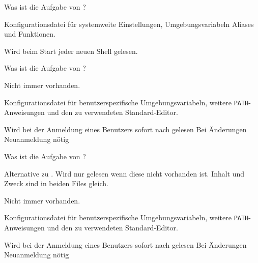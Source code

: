 \begin{flashcard}[File]{Was ist die Aufgabe von ?}
	\begin{description}
		\item Konfigurationsdatei für systemweite Einstellungen, Umgebungsvariabeln Aliases und Funktionen.
		
		\item Wird beim Start jeder neuen Shell gelesen.
	\end{description}
\end{flashcard}

\begin{flashcard}[File]{Was ist die Aufgabe von ?}
	\begin{description}
		\item Nicht immer vorhanden.
		
		\item Konfigurationsdatei für benutzerspezifische Umgebungsvariabeln, weitere \texttt{PATH}-Anweisungen und den zu verwendeten Standard-Editor.
		                                                                                                      
		\item Wird bei der Anmeldung eines Benutzers sofort nach  gelesen \textrightarrow Bei Änderungen Neuanmeldung nötig 
	\end{description}
\end{flashcard}

\begin{flashcard}[File]{Was ist die Aufgabe von ?}
	\begin{description}
		\item Alternative zu . Wird nur gelesen wenn diese nicht vorhanden ist. Inhalt und Zweck sind in beiden Files gleich.
		
		\item Nicht immer vorhanden.
		
		\item Konfigurationsdatei für benutzerspezifische Umgebungsvariabeln, weitere \texttt{PATH}-Anweisungen und den zu verwendeten Standard-Editor.
		
		\item Wird bei der Anmeldung eines Benutzers sofort nach  gelesen \textrightarrow Bei Änderungen Neuanmeldung nötig 
	\end{description}
\end{flashcard}

